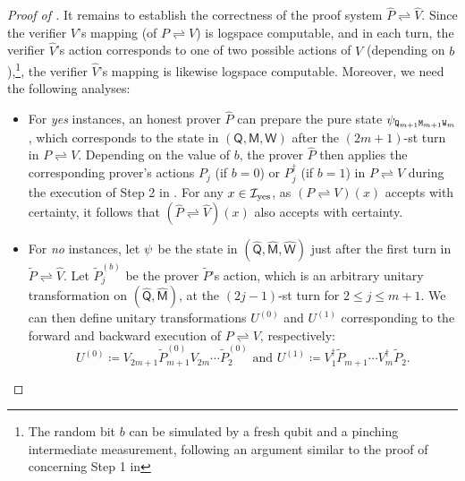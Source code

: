 \documentclass[11pt, a4paper]{article}
\numberwithin{equation}{section}
\numberwithin{figure}{section}
\newcommand{\protocol}[2]{{#1}\!\rightleftharpoons\!{#2}}
\let\ket\relax\DeclarePairedDelimiter\ket{\lvert}{\rangle}
\newcommand{\yes}{{\rm yes}}
\newcommand{\calI}{\mathcal{I}}
\newcommand{\sfM}{\mathsf{M}}
\newcommand{\sfQ}{\mathsf{Q}}
\newcommand{\sfW}{\mathsf{W}}
\newcommand{\ttM}{\mathtt{M}}
\newcommand{\ttQ}{\mathtt{Q}}
\newcommand{\ttW}{\mathtt{W}}
\newcommand{\hatP}{\widehat{P}}
\newcommand{\hatV}{\widehat{V}}
\begin{document}
\begin{proof}[Proof of ]
    \vspace{1em}
    It remains to establish the correctness of the proof system $\protocol{\hatP}{\hatV}$. Since the verifier $V$'s mapping (of $\protocol{P}{V}$) is logspace computable, and in each turn, the verifier $\hatV$'s action corresponds to one of two possible actions of $V$ (depending on $b$),\footnote{The random bit $b$ can be simulated by a fresh qubit and a pinching intermediate measurement, following an argument similar to the proof of  concerning Step 1 in }, the verifier $\hatV$'s mapping is likewise logspace computable. Moreover, we need the following analyses: 
    \begin{itemize}[leftmargin=1.5em]
        \item For \textit{yes} instances, an honest prover $\hatP$ can prepare the pure state $\ket{\psi_{\ttQ_{m+1}\ttM_{m+1}\ttW_m}}$, which corresponds to the state in $(\sfQ,\sfM,\sfW)$ after the $(2m+1)$-st turn in $\protocol{P}{V}$. Depending on the value of $b$, the prover $\hatP$ then applies the corresponding prover's actions $P_j$ (if $b=0$) or $P^{\dagger}_j$ (if $b=1$) in $\protocol{P}{V}$ during the execution of Step 2 in . For any $x\in\calI_{\yes}$, as $(\protocol{P}{V})(x)$ accepts with certainty, it follows that $(\protocol{\hatP}{\hatV})(x)$ also accepts with certainty. 
        
        \item For \textit{no} instances, let $\ket{\psi}$ be the state in $(\widehat{\sfQ},\widehat{\sfM},\widehat{\sfW})$ just after the first turn in $\protocol{\widetilde{P}}{\hatV}$. Let $\widetilde{P}^{(b)}_j$ be the prover $\widetilde{P}$'s action, which is an arbitrary unitary transformation on $(\widehat{\sfQ},\widehat{\sfM})$, at the $(2j-1)$-st turn for $2 \leq j \leq m+1$. We can then define unitary transformations $U^{(0)}$ and $U^{(1)}$ corresponding to the forward and backward execution of $\protocol{P}{V}$, respectively: 
        \begin{equation}
            \label{eq:parallelization-unitaries-def}
            U^{(0)} \coloneqq V_{2m+1} \widetilde{P}^{(0)}_{m+1} V_{2m} \cdots \widetilde{P}^{(0)}_2 \text{ and } U^{(1)} \coloneqq V_1^{\dagger} \widetilde{P}_{m+1} \cdots V_m^{\dagger} \widetilde{P}_2. 
        \end{equation}


\end{itemize}
\end{proof}
\end{document}
